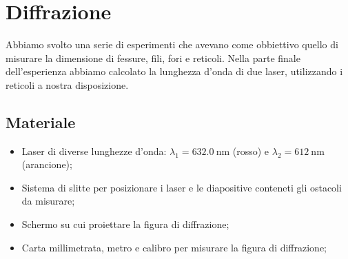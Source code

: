 \section{Diffrazione}

Abbiamo svolto una serie di esperimenti che avevano come obbiettivo quello di misurare la dimensione di fessure, fili,
fori e reticoli. Nella parte finale dell'esperienza abbiamo calcolato la lunghezza d'onda di due laser,
utilizzando i reticoli a nostra disposizione.

\subsection{Materiale}

\begin{itemize}
    \item{Laser di diverse lunghezze d'onda: $\lambda_1 = \SI{632.0}{\nano\metre}$ (rosso) e $\lambda_2 = \SI{612}{\nano\metre}$ (arancione);}
    \item{Sistema di slitte per posizionare i laser e le diapositive conteneti gli ostacoli da misurare;}
    \item{Schermo su cui proiettare la figura di diffrazione;}
    \item{Carta millimetrata, metro e calibro per misurare la figura di diffrazione;}
\end{itemize}
